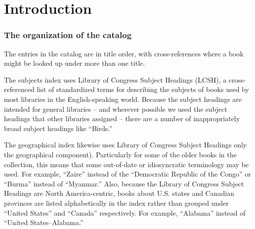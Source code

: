 % 
% 
\chapter*{Introduction}

\subsection*{The organization of the catalog}

The entries in the catalog are in title order, with cross-references where a
book might be looked up under more than one title.

The subjects index uses Library of Congress Subject Headings (LCSH), a
cross-referenced list of standardized terms for describing the subjects of books
used by most libraries in the English-speaking world. Because the subject headings
are intended for general libraries -- and wherever possible we used the subject
headings that other libraries assigned -- there are a number of inappropriately
broad subject headings like ``Birds.''

The geographical index likewise uses Library of Congress Subject Headings only
the geographical component). Particularly for some of the older books in the
collection, this means that some out-of-date or idiosyncratic terminology may be
used. For example, ``Zaire'' instead of the ``Democratic Republic of the Congo''
or ``Burma'' instead of ``Myanmar.'' Also, because the Library of Congress
Subject Headings are North America-centric, books about U.S. states and Canadian
provinces are listed alphabetically in the index rather than grouped under
``United States'' and ``Canada'' respectively. For example, ``Alabama'' instead
of ``United States--Alabama.''

